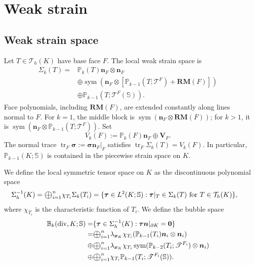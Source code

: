\documentclass[review,hidelinks,onefignum,onetabnum]{siamart251216}
\renewcommand{\div}{\operatorname{div}}
\newcommand{\Oplus}{\ensuremath{\vcenter{\hbox{\scalebox{1.5}{$\oplus$}}}}}
\newcommand{\tr}{\operatorname{tr}}
\newcommand{\sym}{\operatorname{sym}}
\newcommand{\AI}[1]{{\color{blue}#1}}
\begin{document}
\section{Weak strain}\label{sec:strain}

\subsection{Weak strain space}
\AI{Let $T\in\mathcal T_h(K)$ have base face $F$.
The local weak strain space is
\begin{equation}\label{eq:strainspace}
\begin{aligned}
\Sigma_k(T)={}&\mathbb P_k(T)\boldsymbol n_F\otimes\boldsymbol n_F\\
&\oplus\sym\!\left(\boldsymbol n_F\otimes
  [\mathbb P_{k-1}(T;\mathscr T^F)+\mathbf{RM}(F)]\right)\\
&\oplus\mathbb P_{k-1}(T;\mathscr T^F(\mathbb S)).
\end{aligned}
\end{equation}
Face polynomials, including $\mathbf{RM}(F)$, are extended constantly along
lines normal to $F$. For $k=1$, the middle block is
$\sym(\boldsymbol n_F\otimes\mathbf{RM}(F))$; for $k>1$, it is
$\sym(\boldsymbol n_F\otimes\mathbb P_{k-1}(T;\mathscr T^F))$.
Set
\[
V_k(F):=\mathbb P_k(F)\boldsymbol n_F\oplus\boldsymbol V_F.
\]
The normal trace $\tr_F\boldsymbol\sigma:=\boldsymbol\sigma\boldsymbol n_F|_F$
satisfies $\tr_F\Sigma_k(T)=V_k(F)$. In particular,
$\mathbb P_{k-1}(K;\mathbb S)$ is contained in the piecewise strain space on $K$.}

We define the local symmetric tensor space on $K$ as the discontinuous polynomial space
\begin{align}\label{eq:202411132}
\Sigma_h^{-1}(K)&=\Oplus_{i=1}^n\chi_{T_i}\Sigma_k(T_i)=\{\boldsymbol{\tau}\in L^2(K;\mathbb S): \boldsymbol{\tau}|_T\in \Sigma_k(T) \textrm{ for }T\in\mathcal{T}_h(K)\},
\end{align}
where $\chi_{T_i}$ is the characteristic function of $T_i$. We  define the bubble space
\begin{equation}
\begin{aligned}
\mathbb{B}_k(\div,K;\mathbb{S})=&\{\boldsymbol{\tau}\in \Sigma_h^{-1}(K): \boldsymbol{\tau}\boldsymbol{n}|_{\partial K}=\boldsymbol{0}\}\\
=&\Oplus_{i=1}^n\lambda_{\boldsymbol{x}_K}\chi_{T_i}(\mathbb{P}_{k-1}(T_i)\boldsymbol{n}_i\otimes\boldsymbol{n}_i) \\
\oplus
&\Oplus_{i=1}^n\lambda_{\boldsymbol{x}_K}\chi_{T_i}\sym(\mathbb{P}_{k-2}(T_i; \mathscr T^{F_i})\otimes\boldsymbol{n}_i) \\
\oplus 
&\Oplus_{i=1}^n\chi_{T_i}\mathbb{P}_{k-1}(T_i;\mathscr T^{F_i}(\mathbb S)).
\end{aligned}
\end{equation}
\end{document}
